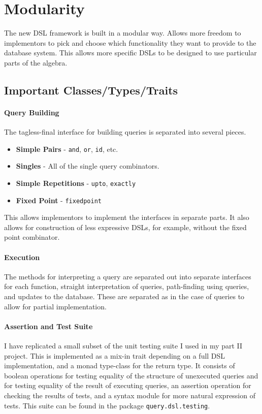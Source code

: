 \documentclass{report}
\newcommand \2[0]{\textbf{2}}
\newcommand \3[0]{\textbf{3}}
\begin{document}
\section{Modularity}
The new DSL framework is built in a modular way. 
Allows more freedom to implementors to pick and choose which functionality they want to provide to the database system. This allows more specific DSLs to be designed to use particular parts of the algebra.
\subsection{Important Classes/Types/Traits}
\paragraph{Query Building}
The tagless-final interface for building queries is separated into several pieces.
\begin{itemize}
    \item \textbf{Simple Pairs} - \texttt{and}, \texttt{or}, \texttt{id}, etc.
    \item \textbf{Singles} - All of the single query combinators.
    \item \textbf{Simple Repetitions} - \texttt{upto}, \texttt{exactly}
    \item \textbf{Fixed Point} - \texttt{fixedpoint}
\end{itemize}

This allows implementors to implement the interfaces in separate parts. It also allows for construction of less expressive DSLs, for example, without the fixed point combinator.

\paragraph{Execution}
The methods for interpreting a query are separated out into separate interfaces for each function, straight interpretation of queries, path-finding using queries, and updates to the database. These are separated as in the case of queries to allow for partial implementation.

\paragraph{Assertion and Test Suite}
I have replicated a small subset of the unit testing suite I used in my part II project. This is implemented as a mix-in trait depending on a full DSL implementation, and a monad type-class for the return type. It consists of boolean operations for testing equality of the structure of unexecuted queries and for testing equality of the result of executing queries, an assertion operation for checking the results of tests, and a syntax module for more natural expression of tests. This suite can be found in the package \texttt{query.dsl.testing}.
\end{document}
